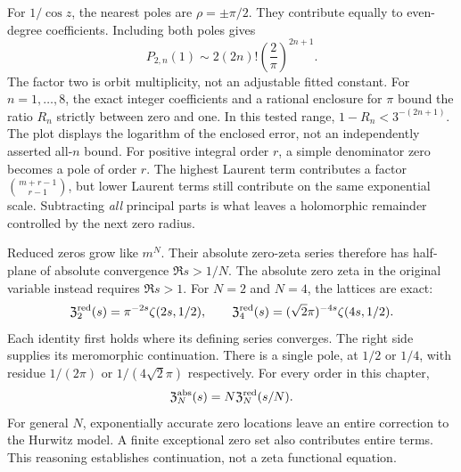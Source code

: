 For $1/\cos z$, the nearest poles are $\rho=\pm\pi/2$. They contribute equally to even-degree coefficients. Including both poles gives
\[
P_{2,n}(1)\sim2(2n)!\left(\frac2\pi\right)^{2n+1}.
\]
The factor two is orbit multiplicity, not an adjustable fitted constant.
For $n=1,\ldots,8$, the exact integer coefficients and a rational enclosure for $\pi$ bound the ratio $R_n$ strictly between zero and one. In this tested range, $1-R_n<3^{-(2n+1)}$. The plot displays the logarithm of the enclosed error, not an independently asserted all-$n$ bound.
For positive integral order $r$, a simple denominator zero becomes a pole of order $r$. The highest Laurent term contributes a factor $\binom{m+r-1}{r-1}$, but lower Laurent terms still contribute on the same exponential scale. Subtracting \emph{all} principal parts is what leaves a holomorphic remainder controlled by the next zero radius.

Reduced zeros grow like $m^N$. Their absolute zero-zeta series therefore has half-plane of absolute convergence $\Re s>1/N$. The absolute zero zeta in the original variable instead requires $\Re s>1$.
For $N=2$ and $N=4$, the lattices are exact:
\[
\mathfrak Z_2^{\rm red}(s)=\pi^{-2s}\zeta(2s,1/2),\qquad
\mathfrak Z_4^{\rm red}(s)=(\sqrt2\pi)^{-4s}\zeta(4s,1/2).
\]
Each identity first holds where its defining series converges. The right side supplies its meromorphic continuation. There is a single pole, at $1/2$ or $1/4$, with residue $1/(2\pi)$ or $1/(4\sqrt2\pi)$ respectively.
For every order in this chapter,
\[
\mathfrak Z_N^{\rm abs}(s)=N\mathfrak Z_N^{\rm red}(s/N).
\]
For general $N$, exponentially accurate zero locations leave an entire correction to the Hurwitz model. A finite exceptional zero set also contributes entire terms. This reasoning establishes continuation, not a zeta functional equation.

